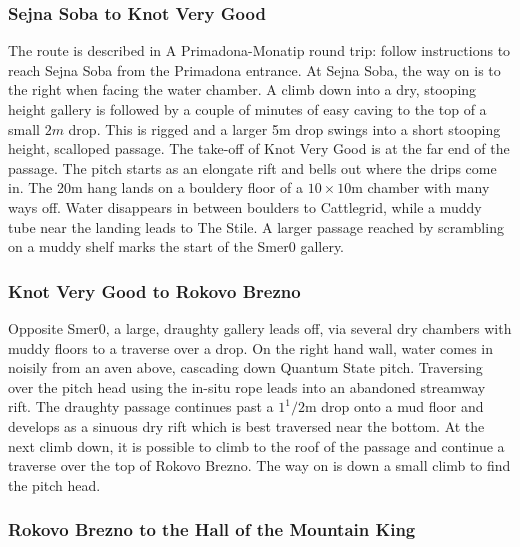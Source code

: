 \hypertarget{sejna-soba-to-knot-very-good}{%
\subsubsection{Sejna Soba to Knot Very Good}\label{sejna-soba-to-knot-very-good}}

The route is described in A Primadona-Monatip round trip: follow instructions to reach Sejna Soba from the Primadona entrance. At Sejna Soba, the way on is to the right when facing the water chamber. A climb down into a dry, stooping height gallery is followed by a couple of minutes of easy caving to the top of a small \(2m\) drop. This is rigged and a larger 5m drop swings into a short stooping height, scalloped passage. The take-off of Knot Very Good is at the far end of the passage. The pitch starts as an elongate rift and bells out where the drips come in. The 20m hang lands on a bouldery floor of a \(10 \times 10\)m chamber with many ways off. Water disappears in between boulders to Cattlegrid, while a muddy tube near the landing leads to The Stile. A larger passage reached by scrambling on a muddy shelf marks the start of the Smer0 gallery.

\hypertarget{knot-very-good-to-rokovo-brezno}{%
\subsubsection{Knot Very Good to Rokovo Brezno}\label{knot-very-good-to-rokovo-brezno}}

Opposite Smer0, a large, draughty gallery leads off, via several dry chambers with muddy floors to a traverse over a drop. On the right hand wall, water comes in noisily from an aven above, cascading down Quantum State pitch. Traversing over the pitch head using the in-situ rope leads into an abandoned streamway rift. The draughty passage continues past a \(1^1/2\)m drop onto a mud floor and develops as a sinuous dry rift which is best traversed near the bottom. At the next climb down, it is possible to climb to the roof of the passage and continue a traverse over the top of Rokovo Brezno. The way on is down a small climb to find the pitch head.

\hypertarget{rokovo-brezno-to-the-hall-of-the-mountain-king}{%
\subsubsection{Rokovo Brezno to the Hall of the Mountain King}\label{rokovo-brezno-to-the-hall-of-the-mountain-king}}

